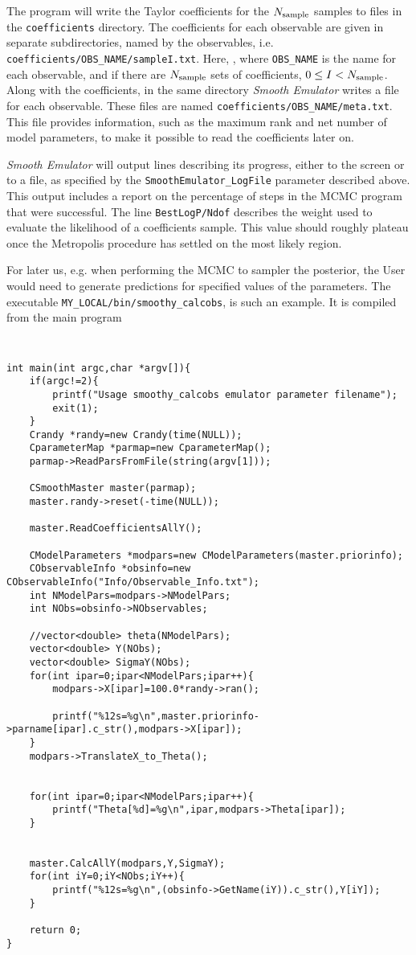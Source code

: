 \documentclass[UserManual.tex]{subfiles}
\begin{document}
The program will write the Taylor coefficients for the $N_{\rm sample}$ samples to files in the {\tt coefficients} directory.  The coefficients for each observable are given in separate subdirectories, named by the observables, i.e. {\tt coefficients/OBS\_NAME/sampleI.txt}. Here, , where {\tt OBS\_NAME} is the name for each observable, and if there are $N_{\rm sample}$ sets of coefficients, $0\le I<N_{\rm sample}$. Along with the coefficients, in the same directory {\it Smooth Emulator} writes a file for each observable. These files are named {\tt coefficients/OBS\_NAME/meta.txt}.  This file provides information, such as the maximum rank and net number of model parameters, to make it possible to read the coefficients later on.

{\it Smooth Emulator} will output lines describing its progress, either to the screen or to a file, as specified by the {\tt SmoothEmulator\_LogFile} parameter described above. This output includes a report on the percentage of steps in the MCMC program that were successful. The line {\tt BestLogP/Ndof} describes the weight used to evaluate the likelihood of a coefficients sample. This value should roughly plateau once the Metropolis procedure has settled on the most likely region.

For later us, e.g. when performing the MCMC to sampler the posterior, the User would need to generate predictions for specified values of the parameters. The executable {\tt MY\_LOCAL/bin/smoothy\_calcobs}, is such an example. It is compiled from the main program
{\tt
\begin{verbatim}
int main(int argc,char *argv[]){
    if(argc!=2){
        printf("Usage smoothy_calcobs emulator parameter filename");
        exit(1);
    }
    Crandy *randy=new Crandy(time(NULL));
    CparameterMap *parmap=new CparameterMap();
    parmap->ReadParsFromFile(string(argv[1]));
    
    CSmoothMaster master(parmap);
    master.randy->reset(-time(NULL));
    
    master.ReadCoefficientsAllY();
    
    CModelParameters *modpars=new CModelParameters(master.priorinfo);
    CObservableInfo *obsinfo=new CObservableInfo("Info/Observable_Info.txt");
    int NModelPars=modpars->NModelPars;
    int NObs=obsinfo->NObservables;
    
    //vector<double> theta(NModelPars);
    vector<double> Y(NObs);
    vector<double> SigmaY(NObs);
    for(int ipar=0;ipar<NModelPars;ipar++){
        modpars->X[ipar]=100.0*randy->ran();
        
        printf("%12s=%g\n",master.priorinfo->parname[ipar].c_str(),modpars->X[ipar]);
    }
    modpars->TranslateX_to_Theta();
    
    
    for(int ipar=0;ipar<NModelPars;ipar++){
        printf("Theta[%d]=%g\n",ipar,modpars->Theta[ipar]);
    }
    
    
    master.CalcAllY(modpars,Y,SigmaY);
    for(int iY=0;iY<NObs;iY++){
        printf("%12s=%g\n",(obsinfo->GetName(iY)).c_str(),Y[iY]);
    }

    return 0;
}

\end{verbatim}
}
\end{document}

